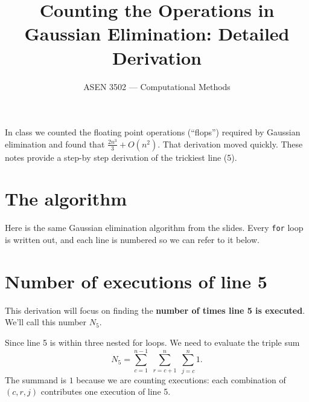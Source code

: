 \documentclass[11pt]{article}
\title{Counting the Operations in Gaussian Elimination: Detailed Derivation}
\author{ASEN 3502 --- Computational Methods}
\date{}
\begin{document}
\maketitle

\noindent
In class we counted the floating point operations (``flops'') required by
Gaussian elimination and found that $\frac{2 n^3}{3} + O(n^2)$. That
derivation moved quickly. These notes provide a step-by step derivation of the trickiest line (5).

\section{The algorithm}

Here is the same Gaussian elimination algorithm from the slides. Every
\texttt{for} loop is written out, and each line is numbered so
we can refer to it below.

\vspace{0.5em}
\begin{algorithm}[H]
  \BlankLine
  \BlankLine
\end{algorithm}
\vspace{0.5em}

\section{Number of executions of line 5}

This derivation will focus on finding the \textbf{number of times line 5 is executed}. We'll call this number $N_5$.

Since line 5 is within three nested for loops. We need to evaluate the triple sum 
\begin{equation}
  \label{eq:triple}
  N_5 = \sum_{c=1}^{n-1} \; \sum_{r=c+1}^{n} \; \sum_{j=c}^{n} 1 .
\end{equation}
The summand is $1$ because we are counting executions: each combination of
$(c, r, j)$ contributes one execution of line 5.
\end{document}
